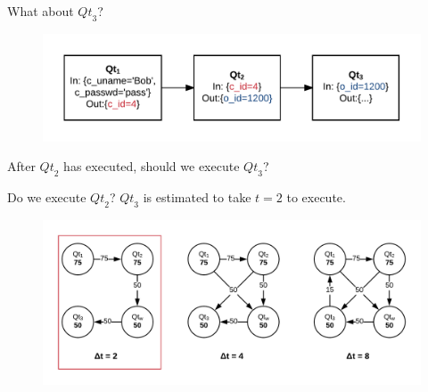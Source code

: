 \documentclass[10pt]{beamer}
\begin{document}
\begin{frame}[fragile]{What about $\mathit{Qt}_3$?}
    \begin{figure}
        \includegraphics[scale=0.22]{apollo_query_pipeline}
    \end{figure}
    After $\mathit{Qt}_2$ has executed, should we execute $\mathit{Qt}_3$? \\
\end{frame}

\begin{frame}[fragile]{Do we execute $\mathit{Qt}_2$?}
    $\mathit{Qt}_3$ is estimated to take $t=2$ to execute.
    \begin{figure}
        \center
        \includegraphics[scale=0.17]{apollo_session_aware_caching_2}
    \end{figure}
\end{frame}
\end{document}
